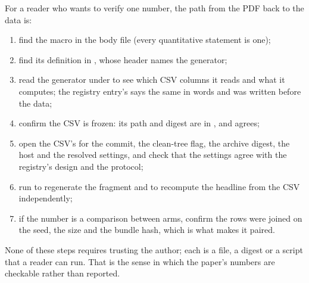 For a reader who wants to verify one number, the path from the PDF back to the data is:
\begingroup\sloppy
\begin{enumerate}
\item find the macro in the body file (every quantitative statement is one);
\item find its definition in , whose header names
  the generator;
\item read the generator under  to see which CSV columns it reads and what
  it computes; the registry entry's  says the same in words
  and was written before the data;
\item confirm the CSV is frozen: its path and digest are in
  , and  agrees;
\item open the CSV's  for the commit, the clean-tree flag, the
  archive digest, the host and the resolved settings, and check that the settings agree
  with the registry's design and the protocol;
\item run  to regenerate the fragment and
   to recompute the headline from the CSV
  independently;
\item if the number is a comparison between arms, confirm the rows were joined on the
  seed, the size and the bundle hash, which is what makes it paired.
\end{enumerate}
\endgroup
None of these steps requires trusting the author; each is a file, a digest or a script
that a reader can run. That is the sense in which the paper's numbers are checkable
rather than reported.


